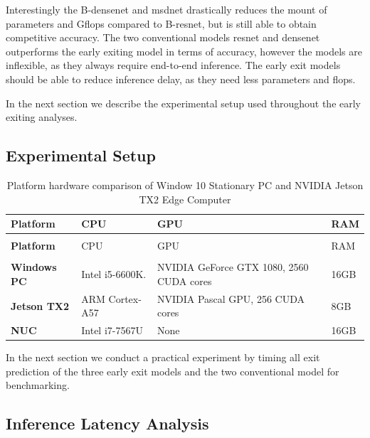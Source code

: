 Interestingly the B-\gls{densenet} and \gls{msdnet} drastically reduces the mount of parameters and G\gls{flop}s compared to B-\gls{resnet}, but is still able to obtain competitive accuracy. The two conventional models \gls{resnet} and \gls{densenet} outperforms the early exiting model in terms of accuracy, however the models are inflexible, as they always require end-to-end inference. The early exit models should be able to reduce inference delay, as they need less parameters and \gls{flop}s.

In the next section we describe the experimental setup used throughout the early exiting analyses.

\subsection{Experimental Setup}

\begin{longtabu}{>{\bfseries}X[0.8]|X[0.8]|X[1.5]|X[r0.3]}
	\caption[Platform hardware comparison]{Platform hardware comparison of Window 10 Stationary PC and NVIDIA Jetson TX2 Edge Computer} \label{tbl:platforms} \\
	\toprule
	\rowfont{\bfseries}
	Platform & CPU & GPU & RAM  \tabularnewline
	\bottomrule
	\endfirsthead
	\\
	\toprule
	\rowfont{\bfseries}
	Platform & CPU & GPU & RAM  \tabularnewline
	\bottomrule
	\endhead %
	\bottomrule
	\\
	\endfoot
	\hline
	\endlastfoot
	Windows PC	& Intel i5-6600K.	& NVIDIA GeForce GTX 1080, 2560 CUDA cores	& 16GB \tabularnewline
	\hline
	Jetson TX2	& ARM Cortex-A57 	& NVIDIA Pascal GPU, 256 CUDA cores 		& 8GB \tabularnewline
	\hline
	NUC		  	& Intel i7-7567U	& None										& 16GB \tabularnewline									
	\bottomrule
\end{longtabu}

In the next section we conduct a practical experiment by timing all exit prediction of the three early exit models and the two conventional model for benchmarking. 

\subsection{Inference Latency Analysis}


